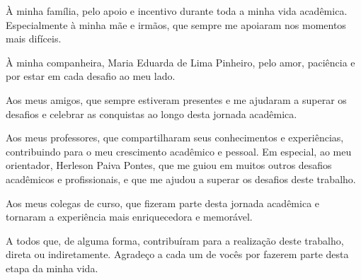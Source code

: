 
\begin{agradecimentos}
  À minha família, pelo apoio e incentivo durante toda a minha vida acadêmica. Especialmente à minha mãe e irmãos, que sempre me apoiaram nos momentos mais difíceis.

  À minha companheira, Maria Eduarda de Lima Pinheiro, pelo amor, paciência e por estar em cada desafio ao meu lado.

  Aos meus amigos, que sempre estiveram presentes e me ajudaram a superar os desafios e celebrar as conquistas ao longo desta jornada acadêmica.

  Aos meus professores, que compartilharam seus conhecimentos e experiências, contribuindo para o meu crescimento acadêmico e pessoal. Em especial, ao meu orientador, Herleson Paiva Pontes, que me guiou em muitos outros desafios acadêmicos e profissionais, e que me ajudou a superar os desafios deste trabalho.
  
  Aos meus colegas de curso, que fizeram parte desta jornada acadêmica e tornaram a experiência mais enriquecedora e memorável.

  A todos que, de alguma forma, contribuíram para a realização deste trabalho, direta ou indiretamente. Agradeço a cada um de vocês por fazerem parte desta etapa da minha vida.
\end{agradecimentos}
